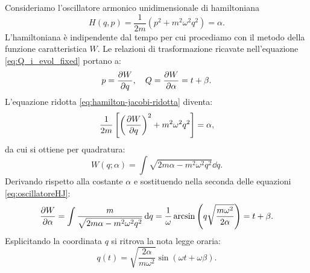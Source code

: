 \vspace{2em}

\begin{example}
    Consideriamo l'oscillatore armonico unidimensionale di hamiltoniana \[H(q,p) = \frac{1}{2m}(p^2 + m^2\omega^2q^2) = \alpha.\] 
    L'hamiltoniana è indipendente dal tempo per cui procediamo con il metodo della funzione caratteristica $W$. Le relazioni di trasformazione ricavate nell'equazione \eqref{eq:Q_i_evol_fixed} portano a:
    \begin{equation}
        \label{eq:oscillatoreHJ}
        p = \pdv{W}{q}, \quad Q = \pdv{W}{\alpha} = t + \beta.
    \end{equation}
    L'equazione ridotta \eqref{eq:hamilton-jacobi-ridotta} diventa:
    \begin{equation*}
        \frac{1}{2m}\left[ \left( \pdv{W}{q} \right)^2 + m^2 \omega^2 q^2 \right] = \alpha,
    \end{equation*}
    da cui si ottiene per quadratura:
    \begin{equation*}
        W(q; \alpha) = \int \sqrt{2m\alpha - m^2 \omega^2 q^2} \dd{q}.
    \end{equation*}
    Derivando rispetto alla costante $\alpha$ e sostituendo nella seconda delle equazioni \eqref{eq:oscillatoreHJ}:
    \begin{equation*}
        \pdv{W}{\alpha} = \int \frac{m}{\sqrt{2m\alpha - m^2 \omega^2 q^2}} \dd{q} = \frac{1}{\omega} \arcsin \left( q\sqrt{\frac{m\omega^2}{2\alpha}} \right) = t + \beta.
    \end{equation*}
    Esplicitando la coordinata $q$ si ritrova la nota legge oraria:
    \begin{equation*}
        q(t) = \sqrt{\frac{2\alpha}{m\omega^2}} \sin(\omega t + \omega\beta).
    \end{equation*}
\end{example}

